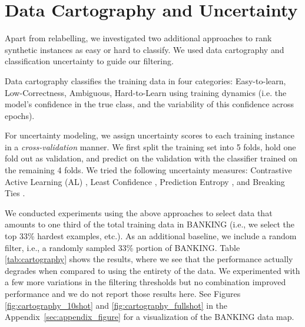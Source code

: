 \documentclass[11pt]{article}
\begin{document}



\appendix

\section{Data Cartography and Uncertainty}
Apart from relabelling, we investigated two additional approaches to rank synthetic instances as easy or hard to classify. We used data cartography \cite{swayamdipta2020dataset} and classification uncertainty to guide our filtering. 

Data cartography classifies the training data in four categories:  Easy-to-learn, Low-Correctness, Ambiguous, Hard-to-Learn using training dynamics (i.e. the model’s confidence in the true class, and the variability of this confidence across epochs).

For uncertainty modeling, we assign uncertainty scores to each training instance in a \textit{cross-validation} manner. 
We first split the training set into 5 folds, hold one fold out as validation, and predict on the validation with the classifier trained on the remaining 4 folds.
We tried the following uncertainty measures: Contrastive Active Learning (AL) \cite{margatina-etal-2021-active}, Least Confidence \cite{DBLP:conf/aaai/CulottaM05}, Prediction Entropy \cite{DBLP:conf/icml/SchohnC00,DBLP:conf/icml/RoyM01}, and Breaking Ties \cite{DBLP:conf/ida/SchefferDW01,DBLP:conf/icpr/LuoKGHSRH04}. 

We conducted experiments using the above approaches to select data that amounts to one third of the total training data in BANKING (i.e., we select the top 33\% hardest examples, etc.). As an additional baseline, we include a random filter, i.e., a randomly sampled 33\% portion of BANKING. Table \ref{tab:cartography} shows the results, where we see that the performance actually degrades when compared to using the entirety of the data. We experimented with a few more variations in the filtering thresholds but no combination improved performance and we do not report those results here. See Figures \ref{fig:cartography_10shot} and \ref{fig:cartography_fullshot} in the Appendix~\ref{sec:appendix_figure} for a visualization of the BANKING data map.
\end{document}
